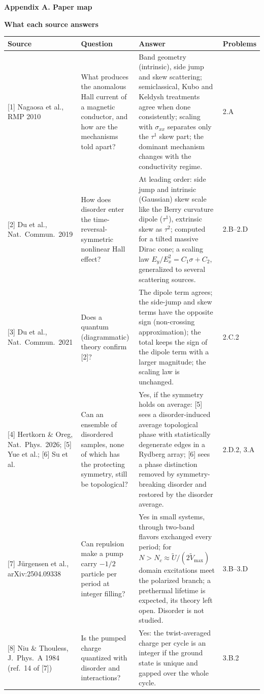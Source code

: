 \documentclass[11pt,a4paper]{article}
\newcommand{\pagetitle}[1]{{\large\bfseries\color{ink}#1}\par\vspace{4pt}}
\newcommand{\smallheading}[1]{\par\Needspace{6\baselineskip}\medskip\textbf{#1}\par}
\begin{document}
\pagetitle{Appendix A. Paper map}
\smallheading{What each source answers}
{\small\begin{tabularx}{\textwidth}{@{}p{30mm}YY p{14mm}@{}}\toprule
Source&Question&Answer&Problems\\\midrule
{[1]} Nagaosa et al., RMP 2010&What produces the anomalous Hall current of a magnetic conductor, and how are the mechanisms told apart?&Band geometry (intrinsic), side jump and skew scattering; semiclassical, Kubo and Keldysh treatments agree when done consistently; scaling with $\sigma_{xx}$ separates only the $\tau^1$ skew part; the dominant mechanism changes with the conductivity regime.&2.A\\
{[2]} Du et al., Nat.\ Commun.\ 2019&How does disorder enter the time-reversal-symmetric nonlinear Hall effect?&At leading order: side jump and intrinsic (Gaussian) skew scale like the Berry curvature dipole ($\tau^1$), extrinsic skew as $\tau^2$; computed for a tilted massive Dirac cone; a scaling law $E_y/E_x^2=C_1\sigma+C_2$, generalized to several scattering sources.&2.B--2.D\\
{[3]} Du et al., Nat.\ Commun.\ 2021&Does a quantum (diagrammatic) theory confirm [2]?&The dipole term agrees; the side-jump and skew terms have the opposite sign (non-crossing approximation); the total keeps the sign of the dipole term with a larger magnitude; the scaling law is unchanged.&2.C.2\\
{[4]} Hertkorn \& Oreg, Nat.\ Phys.\ 2026; [5] Yue et al.; [6] Su et al.&Can an ensemble of disordered samples, none of which has the protecting symmetry, still be topological?&Yes, if the symmetry holds on average: [5] sees a disorder-induced average topological phase with statistically degenerate edges in a Rydberg array; [6] sees a phase distinction removed by symmetry-breaking disorder and restored by the disorder average.&2.D.2, 3.A\\
{[7]} J\"urgensen et al., arXiv:2504.09338&Can repulsion make a pump carry $-1/2$ particle per period at integer filling?&Yes in small systems, through two-band flavors exchanged every period; for $N>N_c\approx\tilde U/(2\tilde V_{\max})$ domain excitations meet the polarized branch; a prethermal lifetime is expected, its theory left open. Disorder is not studied.&3.B--3.D\\
{[8]} Niu \& Thouless, J.\ Phys.\ A 1984 (ref.\ 14 of [7])&Is the pumped charge quantized with disorder and interactions?&Yes: the twist-averaged charge per cycle is an integer if the ground state is unique and gapped over the whole cycle.&3.B.2\\
\bottomrule\end{tabularx}}
\end{document}
